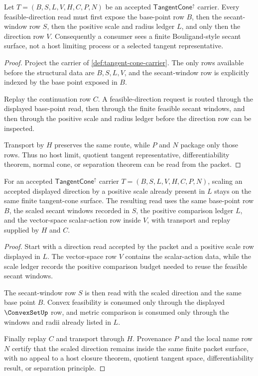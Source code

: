 \begin{theorem}
\label{thm:tangent-cone-secant-window-exposure}
Let $T=(B,S,L,V,H,C,P,N)$ be an accepted $\mathsf{TangentCone}^{\uparrow}$ carrier. Every feasible-direction read must first expose the base-point row $B$, then the secant-window row $S$, then the positive scale and radius ledger $L$, and only then the direction row $V$. Consequently a consumer sees a finite Bouligand-style secant surface, not a host limiting process or a selected tangent representative.
\end{theorem}
\begin{proof}
Project the carrier of \autoref{def:tangent-cone-carrier}. The only rows available before the structural data are $B,S,L,V$, and the secant-window row is explicitly indexed by the base point exposed in $B$.

Replay the continuation row $C$. A feasible-direction request is routed through the displayed base-point read, then through the finite feasible secant windows, and then through the positive scale and radius ledger before the direction row can be inspected.

Transport by $H$ preserves the same route, while $P$ and $N$ package only those rows. Thus no host limit, quotient tangent representative, differentiability theorem, normal cone, or separation theorem can be read from the packet.
\end{proof}

\begin{theorem}
\label{thm:tangent-cone-cone-scaling-stability}
For an accepted $\mathsf{TangentCone}^{\uparrow}$ carrier $T=(B,S,L,V,H,C,P,N)$, scaling an accepted displayed direction by a positive scale already present in $L$ stays on the same finite tangent-cone surface. The resulting read uses the same base-point row $B$, the scaled secant windows recorded in $S$, the positive comparison ledger $L$, and the vector-space scalar-action row inside $V$, with transport and replay supplied by $H$ and $C$.
\end{theorem}
\begin{proof}
Start with a direction read accepted by the packet and a positive scale row displayed in $L$. The vector-space row $V$ contains the scalar-action data, while the scale ledger records the positive comparison budget needed to reuse the feasible secant windows.

The secant-window row $S$ is then read with the scaled direction and the same base point $B$. Convex feasibility is consumed only through the displayed $\ConvexSetUp$ row, and metric comparison is consumed only through the windows and radii already listed in $L$.

Finally replay $C$ and transport through $H$. Provenance $P$ and the local name row $N$ certify that the scaled direction remains inside the same finite packet surface, with no appeal to a host closure theorem, quotient tangent space, differentiability result, or separation principle.
\end{proof}

